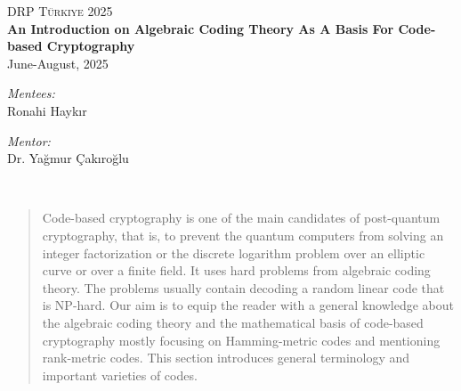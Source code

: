 \begin{titlepage}
\vbox{ }

\vbox{ }

\begin{center}
\textsc{\LARGE DRP Türkiye 2025}\\[1.5cm]

\vbox{ }
{ \huge \bfseries An Introduction on Algebraic Coding Theory As A Basis For Code-based Cryptography}\\[0.5cm]
{\large June-August, 2025}\\[0.5cm]
\begin{minipage}{0.5\textwidth}
\begin{flushleft} \large
\emph{Mentees:}\\
Ronahi Haykır\\ 
\end{flushleft}
\end{minipage}
\begin{minipage}{0.4\textwidth}
\begin{flushright} \large
\emph{Mentor:} \\
Dr. Yağmur Çakıroğlu\\
\end{flushright}
\end{minipage}
\\[2cm]
\begin{abstract}
Code-based cryptography is one of the main candidates of post-quantum cryptography, that is, to prevent the quantum computers from solving an integer factorization or the discrete logarithm problem over an elliptic curve or over a finite field. It uses hard problems from algebraic coding theory. The problems usually contain decoding a random linear code that is NP-hard. Our aim is to equip the reader with a general knowledge about the algebraic coding theory and the mathematical basis of code-based cryptography mostly focusing on Hamming-metric codes and mentioning rank-metric codes. This section introduces general terminology and important varieties of codes.
\end{abstract}

\vfill
\end{center}
\end{titlepage}